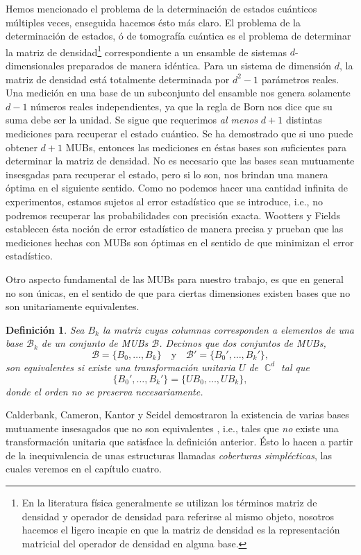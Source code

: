 \documentclass[a4paper]{report}
\DeclareMathOperator{\C}{\mathbb{C}}
\newtheorem{definition}{Definición}
\begin{document}
  Hemos mencionado el problema de la determinación de
  estados cuánticos múltiples veces, enseguida hacemos ésto
  más claro. El problema de la determinación de estados, ó
  de tomografía cuántica es el problema de determinar la
  matriz de densidad\footnote{En la literatura física
    generalmente se utilizan los términos matriz de densidad
    y operador de densidad para referirse al mismo objeto,
    nosotros hacemos el ligero incapie en que la matriz de
    densidad es la representación matricial del operador de
  densidad en alguna base.} correspondiente a un ensamble
  de sistemas $d$-dimensionales preparados de manera
  idéntica. Para un sistema de dimensión $d$, la matriz de
  densidad está totalmente determinada por $d^2-1$
  parámetros reales. Una medición en una base de un
  subconjunto del ensamble nos genera solamente $d-1$
  números reales independientes, ya que la regla de Born
  nos dice que su suma debe ser la unidad. Se sigue que
  requerimos \textit{al menos} $d+1$ distintas mediciones
  para recuperar el estado cuántico. Se ha demostrado que si
  uno puede obtener $d+1$ MUBs, entonces las mediciones en
  éstas bases son suficientes para determinar la matriz de
  densidad. No es necesario que las bases sean mutuamente
  insesgadas para recuperar el estado, pero si lo son, nos
  brindan una manera óptima en el siguiente sentido. Como no
  podemos hacer una cantidad infinita de experimentos,
  estamos sujetos al error estadístico que se introduce,
  i.e., no podremos recuperar las probabilidades con
  precisión exacta. Wootters y Fields  establecen ésta
  noción de error estadístico de manera precisa y prueban
  que las mediciones hechas con MUBs son óptimas en el
  sentido de que minimizan el error estadístico. 

  Otro aspecto fundamental de las MUBs para nuestro trabajo,
  es que en general no son únicas, en el sentido de que para
  ciertas dimensiones existen bases que no son unitariamente
  equivalentes.
  \begin{definition}
    Sea $B_k$ la matriz cuyas columnas corresponden a
    elementos de una base $\mathcal B_k$ de un conjunto de
    MUBs $\mathcal B$. Decimos que dos conjuntos de MUBs, 
    \[
      \mathcal B = \{B_0,\ldots,B_k\}
      \quad \text{y} \quad
      \mathcal B' = \{B_0',\ldots, B_k'\},
    \]
    son equivalentes si existe una transformación unitaria
    $U$ de $\C^{d}$ tal que
    \begin{equation}
      \{B_0',\ldots,B_k'\}
      = \{UB_0, \ldots,UB_k\},
    \end{equation}
    donde el orden no se preserva necesariamente.
  \end{definition}
  Calderbank, Cameron, Kantor y Seidel demostraron la
  existencia de varias bases mutuamente insesagados que no
  son equivalentes \cite{kantor2012}, i.e., tales que
  \textit{no} existe una transformación unitaria que
  satisface la definición anterior. Ésto lo hacen a partir
  de la inequivalencia de unas estructuras llamadas
  \textit{coberturas simplécticas}, las cuales veremos en el
  capítulo cuatro.
\end{document}
